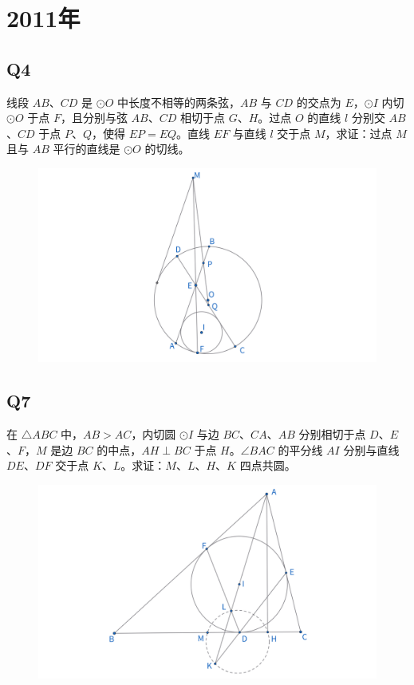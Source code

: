 \documentclass{article}
\begin{document}
\section{2011年}
\subsection{Q4}
线段 $AB$、$CD$ 是 $\odot O$ 中长度不相等的两条弦，$AB$ 与 $CD$ 的交点为 $E$，$\odot I$ 内切 $\odot O$ 于点 $F$，且分别与弦 $AB$、$CD$ 相切于点 $G$、$H$。过点 $O$ 的直线 $l$ 分别交 $AB$、$CD$ 于点 $P$、$Q$，使得 $EP = EQ$。直线 $EF$ 与直线 $l$ 交于点 $M$，求证：过点 $M$ 且与 $AB$ 平行的直线是 $\odot O$ 的切线。
\begin{figure}[htbp]
    \centering
    \includegraphics[width=0.8\linewidth]{figures/西部赛11年Q4.png}
\end{figure}

\subsection{Q7}
在 $\triangle ABC$ 中，$AB > AC$，内切圆 $\odot I$ 与边 $BC$、$CA$、$AB$ 分别相切于点 $D$、$E$、$F$，$M$ 是边 $BC$ 的中点，$AH \perp BC$ 于点 $H$。$\angle BAC$ 的平分线 $AI$ 分别与直线 $DE$、$DF$ 交于点 $K$、$L$。求证：$M$、$L$、$H$、$K$ 四点共圆。
\begin{figure}[htbp]
    \centering
    \includegraphics[width=0.7\linewidth]{figures/西部赛11年Q7.png}
\end{figure}
\end{document}
